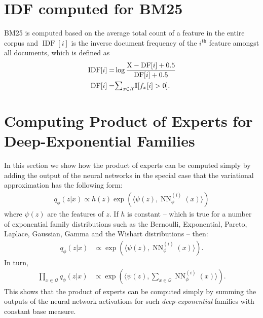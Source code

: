 \documentclass[a4paper]{article}
\newcommand{\ath}[1]{#1^{\textrm{th}}}
\newcommand{\bI}{\mathbb{I}}
\newcommand{\cQ}{\mathcal{Q}}
\newcommand{\cX}{\mathcal{X}}
\newcommand{\ip}[2]{\langle  #1, #2 \rangle}
\newcommand{\rX}{\mathrm{X}}
\DeclareMathOperator{\IDF}{IDF}
\DeclareMathOperator{\NN}{NN}
\newcommand{\infnn}{\NN^{(i)}_\phi}
\newcommand{\sumc}{\raisebox{-0.7ex}{$\mathlarger{\mathlarger{\mathlarger{\mathlarger{\Sigma}}}}$}}
\DeclareMathOperator{\DF}{DF}
\begin{document}


\clearpage
\appendix
\section{IDF computed for BM25}
\label{bm25-idf}
BM25 is computed based on the average total count of a feature in the entire corpus %
and $\IDF[i]$ is the inverse document frequency of the $\ath{i}$ feature amongst all documents,
which is defined as
\begin{align*}
\IDF[i]= &\log \frac{\rX - \DF[i] + 0.5}{\DF[i] + 0.5} \\
\DF[i] = &\sumc_{x \in \cX} \bI[f_x[i] > 0].
\end{align*}


\section{Computing Product of Experts for Deep-Exponential Families}
\label{sec:comp-prod-experts}
In this section we  show how the product of experts can be computed simply by adding the output
of the neural networks in the special case that the variational approximation has the following form:
\begin{align}
q_\phi(z | x) \propto h(z) \exp( \ip{\psi(z) }{\infnn(x)})
\end{align}
where $\psi(z)$ are the features of $z$. If $h$  is constant --
which is true for a number of exponential family distributions such as the Bernoulli, Exponential, Pareto, Laplace, Gaussian, Gamma and the Wishart distributions -- then:
\begin{align*}
  q_\phi(z | x) &\propto \exp( \ip{\psi(z) }{\infnn(x)}).%
\end{align*}
In turn,
\begin{align*}
\prod_{x \in \cQ}q_\phi(z | x) &\propto \exp( \ip{\psi(z) }{\sum_{x \in \cQ}\infnn(x)}).
\end{align*}
This shows that the product of experts can be computed
simply by summing the outputs of the neural network activations
for such \textit{deep-exponential} families with constant base measure.
\end{document}
